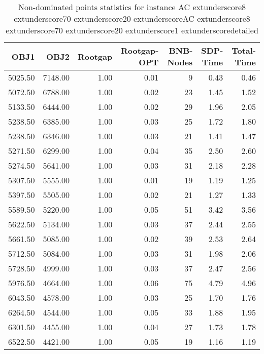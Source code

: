 \begin{table}
\caption{Non-dominated points statistics for instance AC	extunderscore8	extunderscore70	extunderscore20	extunderscoreAC	extunderscore8	extunderscore70	extunderscore20	extunderscore1	extunderscoredetailed}
\label{tab:stats/AC_8_70_20_AC_8_70_20_1_detailed}
\begin{tabular}{rrrrrrr}
\toprule
OBJ1 & OBJ2 & Rootgap & Rootgap-OPT & BNB-Nodes & SDP-Time & Total-Time \\
\midrule
5025.50 & 7148.00 & 1.00 & 0.01 & 9 & 0.43 & 0.46 \\
5072.50 & 6788.00 & 1.00 & 0.02 & 23 & 1.45 & 1.52 \\
5133.50 & 6444.00 & 1.00 & 0.02 & 29 & 1.96 & 2.05 \\
5238.50 & 6385.00 & 1.00 & 0.03 & 25 & 1.72 & 1.80 \\
5238.50 & 6346.00 & 1.00 & 0.03 & 21 & 1.41 & 1.47 \\
5271.50 & 6299.00 & 1.00 & 0.04 & 35 & 2.50 & 2.60 \\
5274.50 & 5641.00 & 1.00 & 0.03 & 31 & 2.18 & 2.28 \\
5307.50 & 5555.00 & 1.00 & 0.01 & 19 & 1.19 & 1.25 \\
5397.50 & 5505.00 & 1.00 & 0.02 & 21 & 1.27 & 1.33 \\
5589.50 & 5220.00 & 1.00 & 0.05 & 51 & 3.42 & 3.56 \\
5622.50 & 5134.00 & 1.00 & 0.03 & 37 & 2.44 & 2.55 \\
5661.50 & 5085.00 & 1.00 & 0.02 & 39 & 2.53 & 2.64 \\
5712.50 & 5084.00 & 1.00 & 0.03 & 31 & 1.98 & 2.06 \\
5728.50 & 4999.00 & 1.00 & 0.03 & 37 & 2.47 & 2.56 \\
5976.50 & 4664.00 & 1.00 & 0.06 & 75 & 4.79 & 4.96 \\
6043.50 & 4578.00 & 1.00 & 0.03 & 25 & 1.70 & 1.76 \\
6264.50 & 4544.00 & 1.00 & 0.05 & 33 & 1.88 & 1.95 \\
6301.50 & 4455.00 & 1.00 & 0.04 & 27 & 1.73 & 1.78 \\
6522.50 & 4421.00 & 1.00 & 0.05 & 19 & 1.16 & 1.19 \\
\bottomrule
\end{tabular}
\end{table}
